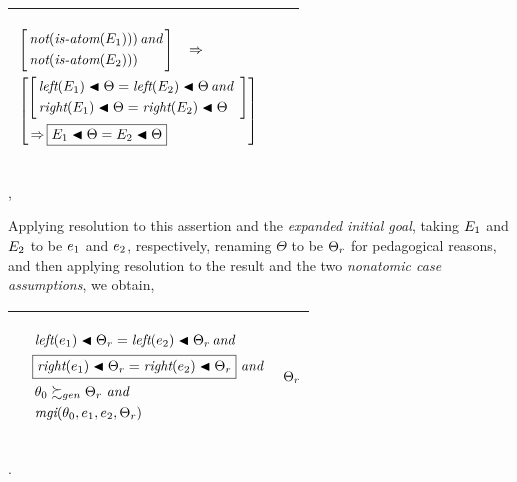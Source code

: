 \documentclass[runningheads]{llncs}
\DeclareMathOperator{\uand}{\emph{and}\,}
\DeclareMathOperator{\unot}{\emph{not}\kern-.0pt}
\DeclareMathOperator{\uimplies}{\Rightarrow}
\DeclareMathOperator{\isatm}{\emph{is-atom}}
\DeclareMathOperator{\lef}{\emph{left}}
\DeclareMathOperator{\rig}{\emph{right}}
\DeclareMathOperator{\mgi}{\emph{mgi}}
\begin{document}
 \begin{center}
  \begin{tabular}{|m{}|m{}||m{}|}
\hline
\begin{center}
$
\begin{aligned}
 &\begin{aligned}
&\left[\begin{aligned}&\unot(\isatm(\E{1}))) \uand \\ 
&\unot(\isatm(\E{2})))\end{aligned}\right] 
\end{aligned} \uimplies \\
&\left[\begin{aligned}
&{\left[\begin{aligned} 
      &\lef(\E{1}) \apply \Theta = \lef(\E{2}) \apply \Theta \uand \,\,\\
      & \rig(\E{1}) \apply \Theta = \rig(\E{2}) \apply \Theta 
     \end{aligned}\right]} \\
    & \uimplies \boxed{\E{1} \apply \Theta = \E{2} \apply \Theta} 
     \end{aligned}\right] 
     \end{aligned}
     $
\end{center}
& &  \\  \hline
\end{tabular},
\end{center}
Applying resolution to this assertion and the \emph{expanded initial goal},
taking $E_{1}$ and $E_{2}$ to be $e_{1}$ and $e_{2}$, respectively, renaming $\Theta$ to be $\Theta_{r}$ for pedagogical reasons, and then applying resolution to the result and the two \emph{nonatomic case assumptions}, we obtain,

\begin{center}
\begin{tabular}{|m{}|m{}||m{}|}
 \hline 
  & 
  \begin{center}
{$\begin{aligned}
 &  \lef(\e{1}) \apply \Thet{r} = \lef(\e{2}) \apply \Thet{r} \uand \\
 &\boxed{\rig(\e{1}) \apply \Thet{r} = \rig(\e{2}) \apply \Thet{r}} \, \uand \\
  & \,\thet{0} \moregen \Thet{r} \, \uand \\
  & \,{\mgi}(\thet{0}, \e{1}, \e{2}, \Thet{r})
\end{aligned}$}
\end{center}
& 
\begin{center}$\Theta_{r}$ \end{center}\\
\hline
\end{tabular}.
\end{center}
\end{document}
